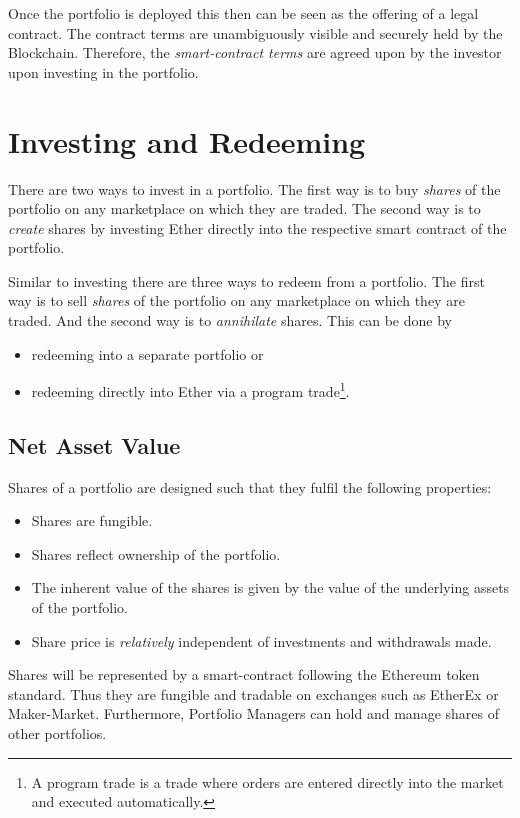 \documentclass[9pt,oneside]{amsart}
\theoremstyle{plain}
\begin{document}
\begin{multicols}{2}
Once the portfolio is deployed this then can be seen as the offering of a legal contract. The contract terms are unambiguously visible and securely held by the Blockchain. Therefore, the \textit{smart-contract terms} are agreed upon by the investor upon investing in the portfolio.
	
\section{Investing and Redeeming}\label{sec:investing}

There are two ways to invest in a portfolio. The first way is to buy \textit{shares} of the portfolio on any marketplace on which they are traded. The second way is to \textit{create} shares by investing Ether directly into the respective smart contract of the portfolio.

Similar to investing there are three ways to redeem from a portfolio. The first way is to sell \textit{shares} of the portfolio on any marketplace on which they are traded. And the second way is to \textit{annihilate} shares.
This can be done by
\begin{itemize}
	\item redeeming into a separate portfolio or
	\item redeeming directly into Ether via a program trade\footnote{A program trade is a trade where orders are entered directly into the market and executed automatically.}.
\end{itemize}

\subsection{Net Asset Value}\label{sub:defshares}

Shares of a portfolio are designed such that they fulfil the following properties:
\begin{itemize}
	\item Shares are fungible.
	\item Shares reflect ownership of the portfolio.
	\item The inherent value of the shares is given by the value of the underlying assets of the portfolio.
	\item Share price is \textit{relatively} independent of investments and withdrawals made.
\end{itemize}

Shares will be represented by a smart-contract following the Ethereum token standard\cite{tokenstandard}. Thus they are fungible and tradable on exchanges such as EtherEx\cite{etherex} or Maker-Market\cite{maker-market}. Furthermore, Portfolio Managers can hold and manage shares of other portfolios.


\end{multicols}
\end{document}
